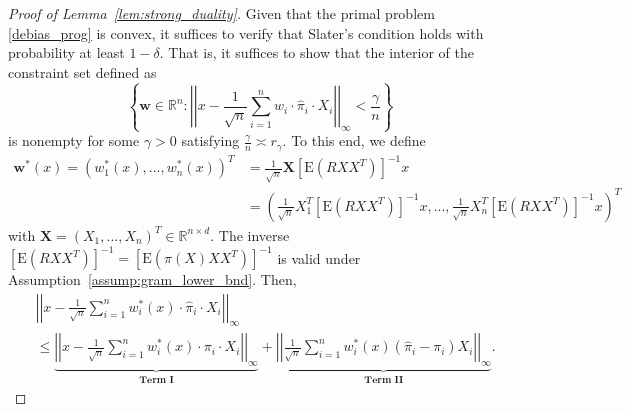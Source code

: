 \documentclass[ejsv2,noshowframe]{imsart}
\theoremstyle{plain}
\theoremstyle{definition}
\theoremstyle{remark}
\newcommand{\norm}[1]{\left|\left| #1 \right|\right|}
\renewcommand{\hat}{\widehat}
\begin{document}
\begin{proof}[Proof of Lemma~\ref{lem:strong_duality}]
	Given that the primal problem \eqref{debias_prog} is convex, it suffices to verify that Slater's condition holds with probability at least $1-\delta$. That is, it suffices to show that the interior of the constraint set defined as 
	$$\left\{\bm{w}\in \mathbb{R}^n:\norm{x-\frac{1}{\sqrt{n}} \sum_{i=1}^n w_i\cdot\hat{\pi}_i\cdot X_i}_{\infty} < \frac{\gamma}{n}\right\}$$ 
	is nonempty for some $\gamma>0$ satisfying $\frac{\gamma}{n}\asymp r_{\gamma}$. To this end, we define
	\begin{align*}
		\bm{w}^*(x)=\left(w_1^*(x),...,w_n^*(x)\right)^T &= \frac{1}{\sqrt{n}} \bm{X}\left[\mathrm{E}\left(RXX^T\right) \right]^{-1} x \\
		&=\left(\frac{1}{\sqrt{n}} X_1^T\left[\mathrm{E}\left(RXX^T\right) \right]^{-1} x,..., \frac{1}{\sqrt{n}} X_n^T\left[\mathrm{E}\left(RXX^T\right) \right]^{-1} x \right)^T
	\end{align*}
	with $\bm{X}=(X_1,...,X_n)^T \in \mathbb{R}^{n\times d}$. The inverse $\left[\mathrm{E}(RXX^T) \right]^{-1}=\left[\mathrm{E}\left(\pi(X) XX^T \right) \right]^{-1}$ is valid under Assumption~\ref{assump:gram_lower_bnd}. Then,
	\begin{align*}
		&\norm{x-\frac{1}{\sqrt{n}} \sum_{i=1}^n w_i^*(x)\cdot\hat{\pi}_i\cdot X_i}_{\infty} \\
		&\leq \underbrace{\norm{x-\frac{1}{\sqrt{n}} \sum_{i=1}^n w_i^*(x)\cdot\pi_i\cdot X_i}_{\infty}}_{\textbf{Term I}} + \underbrace{\norm{\frac{1}{\sqrt{n}} \sum_{i=1}^n w_i^*(x)\left(\hat{\pi}_i-\pi_i\right) X_i}_{\infty}}_{\textbf{Term II}}.
	\end{align*}
	

\end{proof}
\end{document}
